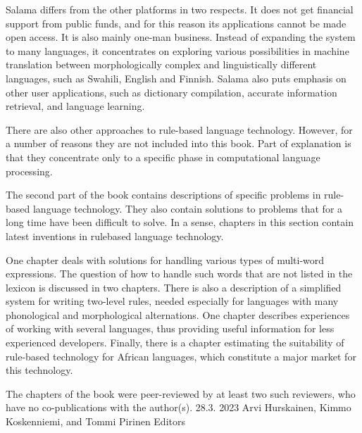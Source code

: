 \documentclass[free]{flammie}
\begin{document}
Salama differs from the other platforms in two respects. It does not get financial
support from public funds, and for this reason its applications cannot be made open
access. It is also mainly one-man business. Instead of expanding the system to many
languages, it concentrates on exploring various possibilities in machine translation
between morphologically complex and linguistically different languages, such as Swahili,
English and Finnish. Salama also puts emphasis on other user applications, such as
dictionary compilation, accurate information retrieval, and language learning.

There are also other approaches to rule-based language technology. However, for a
number of reasons they are not included into this book. Part of explanation is that they
concentrate only to a specific phase in computational language processing.

The second part of the book contains descriptions of specific problems in rule-based
language technology. They also contain solutions to problems that for a long time have
been difficult to solve. In a sense, chapters in this section contain latest inventions in rulebased language technology.

One chapter deals with solutions for handling various types of multi-word expressions.
The question of how to handle such words that are not listed in the lexicon is discussed in
two chapters. There is also a description of a simplified system for writing two-level
rules, needed especially for languages with many phonological and morphological
alternations. One chapter describes experiences of working with several languages, thus
providing useful information for less experienced developers. Finally, there is a chapter
estimating the suitability of rule-based technology for African languages, which
constitute a major market for this technology.

The chapters of the book were peer-reviewed by at least two such reviewers, who have
no co-publications with the author(s).
28.3. 2023
Arvi Hurskainen, Kimmo Koskenniemi, and Tommi Pirinen
Editors
\end{document}
